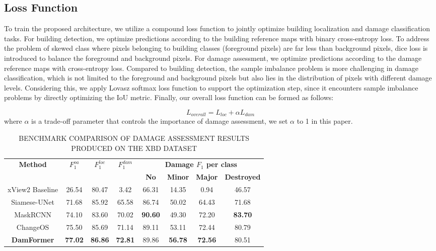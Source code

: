 \documentclass{article}
\begin{document}
\subsection{Loss Function}\label{sec:2.3}
\par To train the proposed architecture, we utilize a compound loss function to jointly optimize building localization and damage classification tasks. For building detection, we optimize predictions according to the building reference maps with binary cross-entropy loss. To address the problem of skewed class where pixels belonging to building classes (foreground pixels) are far less than background pixels, dice loss is introduced to balance the foreground and background pixels.
For damage assessment, we optimize predictions according to the damage reference maps with cross-entropy loss. Compared to building detection, the sample imbalance problem is more challenging in damage classification, which is not limited to the foreground and background pixels but also lies in the distribution of pixels with different damage levels. Considering this, we apply Lovasz softmax loss function \cite{berman2018lovasz} to support the optimization step, since it encounters sample imbalance problems by directly optimizing the IoU metric. 
Finally, our overall loss function can be formed as follows:

\begin{equation}
  L_{overall}=L_{loc}+\alpha L_{dam}
  \label{eq:1}    
\end{equation}
where $\alpha$ is a trade-off parameter that controls the importance of damage assessment, we set $\alpha$ to 1 in this paper. 

\begin{table*}[ht]\small
  \renewcommand{\arraystretch}{1.2}
  \caption{BENCHMARK COMPARISON OF DAMAGE ASSESSMENT RESULTS PRODUCED ON THE XBD DATASET}
  \label{table_1}
  \centering
  \begin{tabular}{c c c c c c c c}
    \hline
    \multirow{2}{*}{\textbf{Method}} & \multirow{2}{*}{\textbf{$F_{1}^{oa}$}}
    & \multirow{2}{*}{\textbf{$F_{1}^{loc}$}}  & \multirow{2}{*}{\textbf{$F_{1}^{dam}$}} &\multicolumn{4}{c}{\textbf{Damage $F_{1}$ per class}}   \\
    \cline{5-8} 
    &  & & & \textbf{No} &  \textbf{Minor} &  \textbf{Major} & \textbf{Destroyed}  \\
    \hline\hline
    xView2 Baseline &	26.54&	80.47&	3.42&	66.31&	14.35&	0.94&	46.57 \\ 	
    Siamese-UNet &	71.68&	85.92&	65.58&	86.74&	50.02&	64.43&	71.68\\ 
    MaskRCNN &	74.10&	83.60&	70.02&	\textbf{90.60}&	49.30&	72.20&	\textbf{83.70}\\ 
    ChangeOS&	75.50&	85.69&	71.14&	89.11&	53.11&	72.44&	80.79\\ 
    \textbf{DamFormer}&	\textbf{77.02}&	\textbf{86.86}&	\textbf{72.81}&	89.86&	\textbf{56.78}&	\textbf{72.56}&	80.51\\ 
    \hline
  \end{tabular}
\end{table*}
\end{document}
